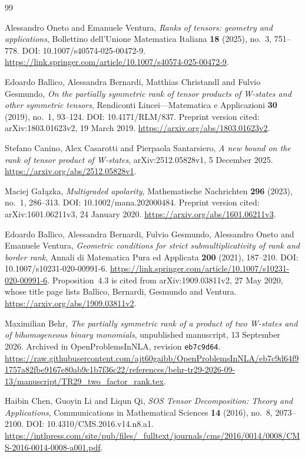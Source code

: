\begin{thebibliography}{99}

Alessandro Oneto and Emanuele Ventura,
\emph{Ranks of tensors: geometry and applications},
Bollettino dell'Unione Matematica Italiana \textbf{18} (2025), no.~3,
751--778. DOI: 10.1007/s40574-025-00472-9.
\url{https://link.springer.com/article/10.1007/s40574-025-00472-9}.

Edoardo Ballico, Alessandra Bernardi, Matthias Christandl and Fulvio Gesmundo,
\emph{On the partially symmetric rank of tensor products of W-states and
other symmetric tensors},
Rendiconti Lincei---Matematica e Applicazioni \textbf{30} (2019), no.~1,
93--124. DOI: 10.4171/RLM/837.
Preprint version cited: arXiv:1803.01623v2, 19 March 2019.
\url{https://arxiv.org/abs/1803.01623v2}.

Stefano Canino, Alex Casarotti and Pierpaola Santarsiero,
\emph{A new bound on the rank of tensor product of W-states},
arXiv:2512.05828v1, 5 December 2025.
\url{https://arxiv.org/abs/2512.05828v1}.

Maciej Ga{\l}\k{a}zka,
\emph{Multigraded apolarity},
Mathematische Nachrichten \textbf{296} (2023), no.~1, 286--313.
DOI: 10.1002/mana.202000484.
Preprint version cited: arXiv:1601.06211v3, 24 January 2020.
\url{https://arxiv.org/abs/1601.06211v3}.

Edoardo Ballico, Alessandra Bernardi, Fulvio Gesmundo,
Alessandro Oneto and Emanuele Ventura,
\emph{Geometric conditions for strict submultiplicativity of rank and
border rank},
Annali di Matematica Pura ed Applicata \textbf{200} (2021), 187--210.
DOI: 10.1007/s10231-020-00991-6.
\url{https://link.springer.com/article/10.1007/s10231-020-00991-6}.
Proposition~4.3 is cited from arXiv:1909.03811v2, 27 May 2020,
whose title page lists Ballico, Bernardi, Gesmundo and Ventura.
\url{https://arxiv.org/abs/1909.03811v2}.

Maximilian Behr,
\emph{The partially symmetric rank of a product of two W-states and
of bihomogeneous binary monomials},
unpublished manuscript, 13 September 2026.
Archived in OpenProblemsInNLA, revision \texttt{eb7c9d64}.
\url{https://raw.githubusercontent.com/ajt60gaibb/OpenProblemsInNLA/eb7c9d64f91757a82fbe9167e80ab9c1b7f36c22/references/behr-tr29-2026-09-13/manuscript/TR29_two_factor_rank.tex}.


Haibin Chen, Guoyin Li and Liqun Qi,
\emph{SOS Tensor Decomposition: Theory and Applications},
Communications in Mathematical Sciences \textbf{14} (2016), no.~8,
2073--2100. DOI: 10.4310/CMS.2016.v14.n8.a1.
\url{https://intlpress.com/site/pub/files/_fulltext/journals/cms/2016/0014/0008/CMS-2016-0014-0008-a001.pdf}.

\end{thebibliography}
